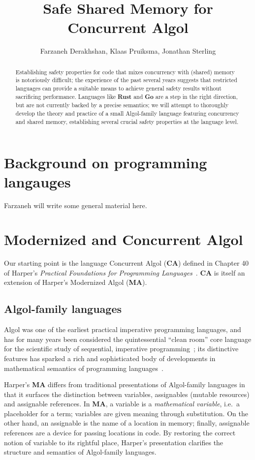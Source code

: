 \documentclass{article}
\title{Safe Shared Memory for Concurrent Algol}
\author{Farzaneh Derakhshan, Klaas Pruiksma, Jonathan Sterling}
\newcommand\Lang[1]{{\sffamily\bfseries{#1}}}
\newcommand\LangCA{\Lang{CA}}
\newcommand\LangMA{\Lang{MA}}
\begin{document}
\maketitle

\begin{abstract}
  Establishing safety properties for code that mixes concurrency with
  (shared) memory is notoriously difficult; the experience of the past
  several years suggests that restricted languages can provide a
  suitable means to achieve general safety results without sacrificing
  performance. Languages like \Lang{Rust} and \Lang{Go} are a step in
  the right direction, but are not currently backed by a precise
  semantics; we will attempt to thoroughly develop the theory and
  practice of a small Algol-family language featuring concurrency and
  shared memory, establishing several crucial safety properties at the
  language level.
\end{abstract}

\section{Background on programming langauges}

Farzaneh will write some general material here.

\section{Modernized and Concurrent Algol}

Our starting point is the language Concurrent Algol (\LangCA) defined
in Chapter 40 of Harper's \emph{Practical Foundations for Programming
  Languages}~\cite{harper:2016}. \LangCA{} is itself an extension of
Harper's Modernized Algol (\LangMA).

\subsection{Algol-family languages}

Algol was one of the earliest practical imperative programming
languages, and has for many years been considered the quintessential
``clean room'' core language for the scientific study of sequential,
imperative programming~\cite{reynolds:1997}; its distinctive features
has sparked a rich and sophisticated body of developments in
mathematical semantics of programming
languages~\cite{mccusker-power:2010}.

Harper's \LangMA{} differs from traditional presentations of
Algol-family languages in that it surfaces the distinction between
variables, assignables (mutable resources) and assignable
references. In \LangMA{}, a variable is a \emph{mathematical
  variable}, i.e.\ a placeholder for a term; variables are given
meaning through substitution. On the other hand, an assignable is the
name of a location in memory; finally, assignable references are a
device for passing locations in code. By restoring the correct notion
of variable to its rightful place, Harper's presentation clarifies the
structure and semantics of Algol-family languages.
\end{document}

